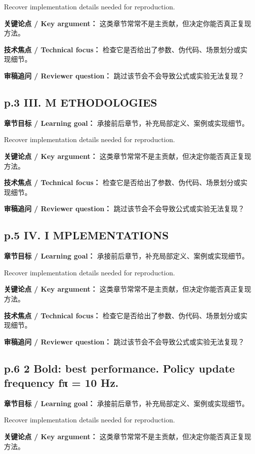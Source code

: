\documentclass[UTF8,a4paper,11pt,fontset=fandol]{ctexart}
\begin{document}
Recover implementation details needed for reproduction.

\textbf{关键论点 / Key argument：} 这类章节常常不是主贡献，但决定你能否真正复现方法。

\textbf{技术焦点 / Technical focus：} 检查它是否给出了参数、伪代码、场景划分或实现细节。

\textbf{审稿追问 / Reviewer question：} 跳过该节会不会导致公式或实验无法复现？

\subsection*{p.3 III. M ETHODOLOGIES}
\textbf{章节目标 / Learning goal：} 承接前后章节，补充局部定义、案例或实现细节。

Recover implementation details needed for reproduction.

\textbf{关键论点 / Key argument：} 这类章节常常不是主贡献，但决定你能否真正复现方法。

\textbf{技术焦点 / Technical focus：} 检查它是否给出了参数、伪代码、场景划分或实现细节。

\textbf{审稿追问 / Reviewer question：} 跳过该节会不会导致公式或实验无法复现？

\subsection*{p.5 IV. I MPLEMENTATIONS}
\textbf{章节目标 / Learning goal：} 承接前后章节，补充局部定义、案例或实现细节。

Recover implementation details needed for reproduction.

\textbf{关键论点 / Key argument：} 这类章节常常不是主贡献，但决定你能否真正复现方法。

\textbf{技术焦点 / Technical focus：} 检查它是否给出了参数、伪代码、场景划分或实现细节。

\textbf{审稿追问 / Reviewer question：} 跳过该节会不会导致公式或实验无法复现？

\subsection*{p.6 2 Bold: best performance. Policy update frequency fπ = 10 Hz.}
\textbf{章节目标 / Learning goal：} 承接前后章节，补充局部定义、案例或实现细节。

Recover implementation details needed for reproduction.

\textbf{关键论点 / Key argument：} 这类章节常常不是主贡献，但决定你能否真正复现方法。
\end{document}
